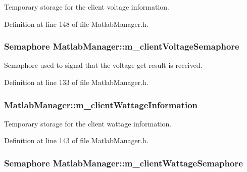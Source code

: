 Temporary storage for the client voltage information. 



Definition at line 148 of file Matlab\-Manager.\-h.

\hypertarget{class_matlab_manager_a18a1ab2e178279313daf7a0790b91f04}{
\subsubsection[{m\-\_\-client\-Voltage\-Semaphore}]{\setlength{\rightskip}{0pt plus 5cm}Semaphore Matlab\-Manager\-::m\-\_\-client\-Voltage\-Semaphore\hspace{0.3cm}{\ttfamily [private]}}}\label{class_matlab_manager_a18a1ab2e178279313daf7a0790b91f04}


Semaphore used to signal that the voltage get result is received. 



Definition at line 133 of file Matlab\-Manager.\-h.

\hypertarget{class_matlab_manager_af4c255ddf41fda74a77367a17520d21f}{
\subsubsection[{m\-\_\-client\-Wattage\-Information}]{ Matlab\-Manager\-::m\-\_\-client\-Wattage\-Information\hspace{0.3cm}{\ttfamily [private]}}}\label{class_matlab_manager_af4c255ddf41fda74a77367a17520d21f}


Temporary storage for the client wattage information. 



Definition at line 143 of file Matlab\-Manager.\-h.

\hypertarget{class_matlab_manager_a476eb9e68029520e9032f58672b7829e}{
\subsubsection[{m\-\_\-client\-Wattage\-Semaphore}]{\setlength{\rightskip}{0pt plus 5cm}Semaphore Matlab\-Manager\-::m\-\_\-client\-Wattage\-Semaphore\hspace{0.3cm}{\ttfamily [private]}}}\label{class_matlab_manager_a476eb9e68029520e9032f58672b7829e}


